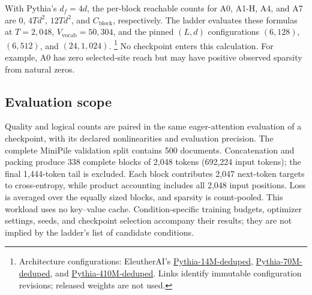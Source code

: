 With Pythia's $d_f=4d$, the per-block reachable counts for A0, A1-H, A4, and A7
are $0$, $4Td^2$, $12Td^2$, and $C_{\mathrm{block}}$, respectively. The ladder
evaluates these formulas at $T=2{,}048$, $V_{\!\mathrm{vocab}}=50{,}304$, and
the pinned $(L,d)$ configurations $(6,128)$, $(6,512)$, and $(24,1{,}024)$.%
\footnote{Architecture configurations: EleutherAI's
\href{https://huggingface.co/EleutherAI/pythia-14m-deduped/blob/7386d9a4ae45aef494a6e704910394def3037fc5/config.json}{Pythia-14M-deduped},
\href{https://huggingface.co/EleutherAI/pythia-70m-deduped/blob/e93a9faa9c77e5d09219f6c868bfc7a1bd65593c/config.json}{Pythia-70M-deduped}, and
\href{https://huggingface.co/EleutherAI/pythia-410m-deduped/blob/b5e8535141902c0e985cea61fd02afe7fe86af32/config.json}{Pythia-410M-deduped}.
Links identify immutable configuration revisions; released weights are not used.}
No checkpoint enters this calculation. For example, A0 has zero selected-site
reach but may have positive observed sparsity from natural zeros.

\subsection{Evaluation scope}
\label{app:evaluation}

Quality and logical counts are paired in the same eager-attention evaluation
of a checkpoint, with its declared nonlinearities and evaluation precision. The complete
MiniPile validation split contains 500 documents. Concatenation and packing
produce 338 complete blocks of 2,048 tokens (692,224 input tokens); the final
1,444-token tail is excluded. Each block contributes 2,047 next-token targets
to cross-entropy, while product accounting includes all 2,048 input positions.
Loss is averaged over the equally sized blocks, and sparsity is count-pooled.
This workload uses no key--value cache. Condition-specific training budgets,
optimizer settings, seeds, and checkpoint selection accompany their results;
they are not implied by the ladder's list of candidate conditions.


